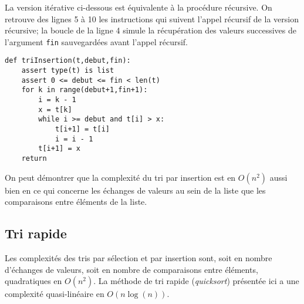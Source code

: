 La version itérative ci-dessous est équivalente à la procédure récursive. On retrouve des 
lignes 5 à 10 les instructions qui suivent l'appel récursif de la version récursive;
la boucle de la ligne 4 simule la récupération des valeurs successives de l'argument {\tt fin} 
sauvegardées avant l'appel récursif.
{}
\begin{lstlisting}[title={\bf Tri par insertion}]
def triInsertion(t,debut,fin):
    assert type(t) is list
    assert 0 <= debut <= fin < len(t)
    for k in range(debut+1,fin+1):
        i = k - 1
        x = t[k]
        while i >= debut and t[i] > x:
            t[i+1] = t[i]
            i = i - 1
        t[i+1] = x
    return
\end{lstlisting}

On peut démontrer que la complexité du tri par insertion est en $O(n^2)$
aussi bien en ce qui concerne les échanges de valeurs au sein de la liste
que les comparaisons entre éléments de la liste.

\subsection{Tri rapide}\label{sub:triRapide}
Les complexités des tris par sélection et par insertion sont, 
soit en nombre d'échanges de valeurs, soit en nombre de comparaisons entre éléments,
quadratiques en $O(n^2)$. La méthode de tri rapide ({\em quicksort}) présentée ici 
a  une complexité quasi-linéaire en $O(n\log(n))$.

